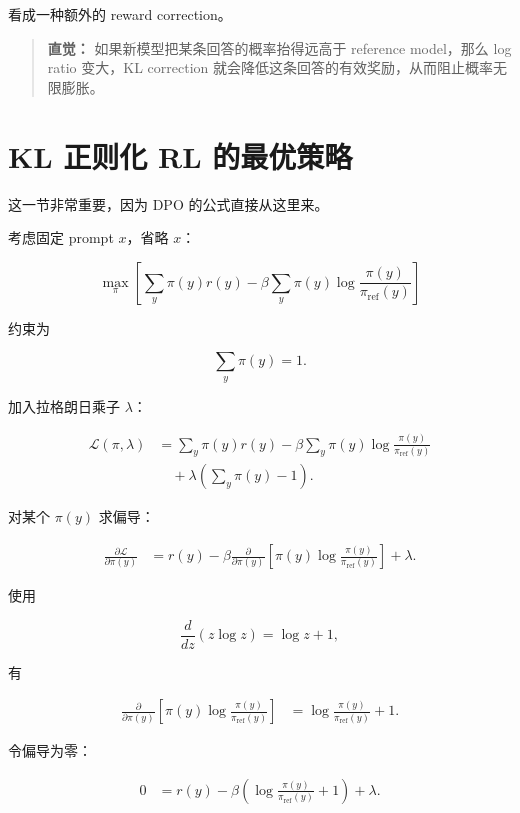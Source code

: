 \documentclass[11pt,a4paper]{ctexart}
\newcommand{\piref}{\pi_{\mathrm{ref}}}
\newenvironment{intuition}
{\begin{quote}\small\textbf{直觉：}}
{\end{quote}}
\begin{document}
看成一种额外的 reward correction。

\begin{intuition}
如果新模型把某条回答的概率抬得远高于 reference model，那么 log ratio 变大，KL correction 就会降低这条回答的有效奖励，从而阻止概率无限膨胀。
\end{intuition}

\section{KL 正则化 RL 的最优策略}

这一节非常重要，因为 DPO 的公式直接从这里来。

考虑固定 prompt $x$，省略 $x$：

\begin{equation}
\max_{\pi}
\left[
\sum_y \pi(y)r(y)
-
\beta
\sum_y
\pi(y)
\log
\frac{\pi(y)}{\piref(y)}
\right]
\end{equation}

约束为

\[
\sum_y\pi(y)=1.
\]

加入拉格朗日乘子 $\lambda$：

\begin{align}
\mathcal{L}(\pi,\lambda)
&=
\sum_y\pi(y)r(y)
-
\beta
\sum_y
\pi(y)
\log\frac{\pi(y)}{\piref(y)}
\\
&\quad
+
\lambda
\left(
\sum_y\pi(y)-1
\right).
\end{align}

对某个 $\pi(y)$ 求偏导：

\begin{align}
\frac{\partial\mathcal{L}}{\partial\pi(y)}
&=
r(y)
-
\beta
\frac{\partial}{\partial\pi(y)}
\left[
\pi(y)
\log\frac{\pi(y)}{\piref(y)}
\right]
+
\lambda.
\end{align}

使用

\[
\frac{d}{dz}
\left(
z\log z
\right)
=
\log z+1,
\]

有

\begin{align}
\frac{\partial}{\partial\pi(y)}
\left[
\pi(y)
\log\frac{\pi(y)}{\piref(y)}
\right]
&=
\log\frac{\pi(y)}{\piref(y)}
+1.
\end{align}

令偏导为零：

\begin{align}
0
&=
r(y)
-
\beta
\left(
\log\frac{\pi(y)}{\piref(y)}
+1
\right)
+
\lambda.
\end{align}
\end{document}
